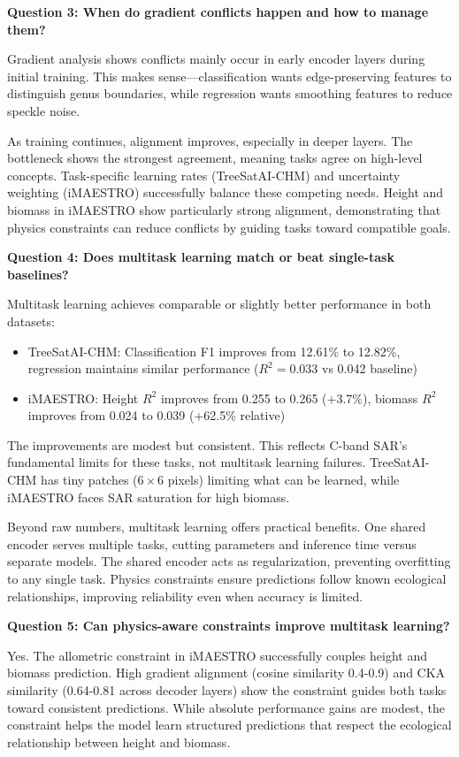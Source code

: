 \textbf{Question 3: When do gradient conflicts happen and how to manage them?}

Gradient analysis shows conflicts mainly occur in early encoder layers during initial training. This makes sense---classification wants edge-preserving features to distinguish genus boundaries, while regression wants smoothing features to reduce speckle noise.

As training continues, alignment improves, especially in deeper layers. The bottleneck shows the strongest agreement, meaning tasks agree on high-level concepts. Task-specific learning rates (TreeSatAI-CHM) and uncertainty weighting (iMAESTRO) successfully balance these competing needs. Height and biomass in iMAESTRO show particularly strong alignment, demonstrating that physics constraints can reduce conflicts by guiding tasks toward compatible goals.

\textbf{Question 4: Does multitask learning match or beat single-task baselines?}

Multitask learning achieves comparable or slightly better performance in both datasets:
\begin{itemize}
    \item TreeSatAI-CHM: Classification F1 improves from 12.61\% to 12.82\%, regression maintains similar performance ($R^2 = 0.033$ vs 0.042 baseline)
    \item iMAESTRO: Height $R^2$ improves from 0.255 to 0.265 (+3.7\%), biomass $R^2$ improves from 0.024 to 0.039 (+62.5\% relative)
\end{itemize}

The improvements are modest but consistent. This reflects C-band SAR's fundamental limits for these tasks, not multitask learning failures. TreeSatAI-CHM has tiny patches ($6\times 6$ pixels) limiting what can be learned, while iMAESTRO faces SAR saturation for high biomass.

Beyond raw numbers, multitask learning offers practical benefits. One shared encoder serves multiple tasks, cutting parameters and inference time versus separate models. The shared encoder acts as regularization, preventing overfitting to any single task. Physics constraints ensure predictions follow known ecological relationships, improving reliability even when accuracy is limited.

\textbf{Question 5: Can physics-aware constraints improve multitask learning?}

Yes. The allometric constraint in iMAESTRO successfully couples height and biomass prediction. High gradient alignment (cosine similarity 0.4-0.9) and CKA similarity (0.64-0.81 across decoder layers) show the constraint guides both tasks toward consistent predictions. While absolute performance gains are modest, the constraint helps the model learn structured predictions that respect the ecological relationship between height and biomass.

